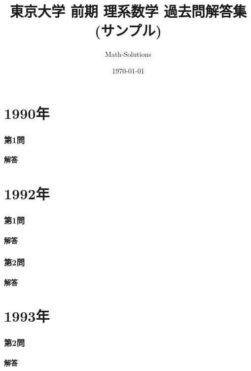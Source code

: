 \documentclass[a4paper,11pt]{ltjsarticle}
\title{東京大学 前期 理系数学 過去問解答集 (サンプル)}
\author{Math-Solutions}
\date{\today}
\begin{document}
\maketitle
\clearpage

\part*{1990年}
\section*{第1問}

\subsection*{解答}

\clearpage

\part*{1992年}
\section*{第1問}

\subsection*{解答}

\clearpage

\section*{第2問}

\subsection*{解答}

\clearpage

\part*{1993年}
\section*{第2問}

\subsection*{解答}

\clearpage
\end{document}
